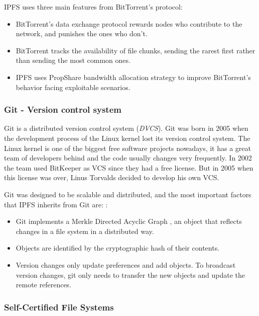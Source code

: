 IPFS uses three main features from BitTorrent's protocol\cite{benet2014ipfs}:
\begin{itemize}
\item BitTorrent's data exchange protocol rewards nodes who contribute to the
  network, and punishes the ones who don't.
\item BitTorrent tracks the availability of file chunks, sending the rarest
  first rather than sending the most common ones.
\item IPFS uses PropShare\cite{levin2008bittorrent} bandwidth allocation
  strategy to improve BitTorrent's behavior facing exploitable scenarios.
\end{itemize}

\subsubsection{Git - Version control system}
\label{tech:sec:ipfs:git}
Git is a distributed version control system (\emph{DVCS})\cite{torvalds2010git}.
Git was born in 2005 when the development process of the Linux kernel lost its
version control system. The Linux kernel is one of the biggest free software
projects nowadays, it has a great team of developers behind and the code usually
changes very frequently. In 2002 the team used BitKeeper as VCS since they had a
free license. But in 2005 when this license was over, Linus Torvalds decided to
develop his own VCS\cite{spinellis2005version}.

Git was designed to be scalable and distributed, and the most important factors
that IPFS inherits from Git are: \cite{benet2014ipfs}:

\begin{itemize}
\item Git implements a Merkle Directed Acyclic Graph
  \cite{bleichenbacher1994directed}, an object that reflects changes in a file
  system in a distributed way.
\item Objects are identified by the cryptographic hash of their contents.
\item Version changes only update preferences and add objects. To broadcast
  version changes, git only needs to transfer the new objects and update the
  remote references.
\end{itemize}

\subsubsection{Self-Certified File Systems}
\label{tech:sec:ipfs:scfs}

